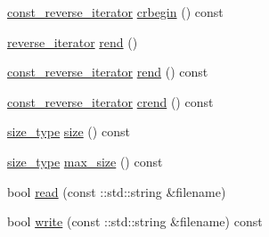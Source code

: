\begin{DoxyCompactItemize}
\hyperlink{classtrimesh_1_1XForm_a00d4231576ef7499e29885da090e807f}{const\+\_\+reverse\+\_\+iterator} \hyperlink{classtrimesh_1_1XForm_a91980e192ae3e19f57ccb1cde5d00953}{crbegin} () const
\item 
\hyperlink{classtrimesh_1_1XForm_a4729ea67a4ad434be421b066af3b672c}{reverse\+\_\+iterator} \hyperlink{classtrimesh_1_1XForm_aa8654437cbc439236d94346f20fe34f8}{rend} ()
\item 
\hyperlink{classtrimesh_1_1XForm_a00d4231576ef7499e29885da090e807f}{const\+\_\+reverse\+\_\+iterator} \hyperlink{classtrimesh_1_1XForm_aec0170f12d76cc1462363060b6a3a35a}{rend} () const
\item 
\hyperlink{classtrimesh_1_1XForm_a00d4231576ef7499e29885da090e807f}{const\+\_\+reverse\+\_\+iterator} \hyperlink{classtrimesh_1_1XForm_acc0ac28eceb88802b93ebe4013653e26}{crend} () const
\item 
\hyperlink{classtrimesh_1_1XForm_aa219f141417c9026a74dec8b6279d4bf}{size\+\_\+type} \hyperlink{classtrimesh_1_1XForm_a9194a9092400c8def3bad6cb71224de4}{size} () const
\item 
\hyperlink{classtrimesh_1_1XForm_aa219f141417c9026a74dec8b6279d4bf}{size\+\_\+type} \hyperlink{classtrimesh_1_1XForm_a0782fcfe145735c39e01ef4c4fc263cb}{max\+\_\+size} () const
\item 
bool \hyperlink{classtrimesh_1_1XForm_a77252ad3a4017bb652723c1aa3c0629f}{read} (const \+::std\+::string \&filename)
\item 
bool \hyperlink{classtrimesh_1_1XForm_af25e9dfee117f59d100cc72957b71305}{write} (const \+::std\+::string \&filename) const
\end{DoxyCompactItemize}
